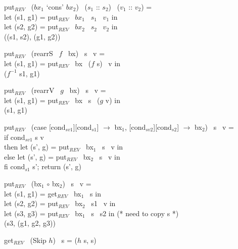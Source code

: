 \documentclass[runningheads]{llncs}
\newcommand{\revput}[3]{put$_{REV}$ \ {#1} \ {#2} \ {#3}}
\newcommand{\revget}[2]{get$_{REV}$ \ {#1} \ {#2}}
\newcommand{\product}[2]{({#1} `cons' {#2})}
\newcommand{\tuple}[2]{(#1 :: #2)}
\newcommand{\rearrS}[2]{rearrS \ #1 \ #2}
\newcommand{\rearrV}[2]{rearrV \ #1 \ #2}
\newcommand{\casebx}[6]{case [#1][#2] $\to$ #3, [#4][#5] $\to$ #6}
\begin{document}
\noindent
\revput{\product{$bx_1$}{$bx_2$}}{\tuple{$s_1$}{$s_2$}}{\tuple{$v_1$}{$v_2$}} =\\
\hspace{5mm}let (s1, g1) = \revput{$bx_1$}{$s_1$}{$v_1$} in\\
\hspace{5mm}let (s2, g2) = \revput{$bx_2$}{$s_2$}{$v_2$} in\\
\hspace{5mm}((s1, s2), (g1, g2))

\noindent
\revput{(\rearrS{$f$}{bx})}{s}{v} =\\
\hspace{5mm}let (s1, g1) = \revput{bx}{($f$ s)}{v} in\\
\hspace{5mm}($f^{-1}$ s1, g1)

\noindent
\revput{(\rearrV{$g$}{bx})}{s}{v} =\\
\hspace{5mm} let (s1, g1) = \revput{bx}{s}{($g$ v)} in\\
\hspace{5mm} (s1, g1)

\noindent
\revput{(\casebx{cond$_{sv1}$}{cond$_{s1}$}{bx$_1$}{cond$_{sv2}$}{cond$_{s2}$}{bx$_2$})}{s}{v} =\\
\hspace{5mm} if {cond$_{sv1}$ s v}\\
\hspace{5mm} then let (s', g) = \revput{bx$_1$}{s}{v} in\\
\hspace{5mm} else let (s', g) = \revput{bx$_2$}{s}{v} in\\
\hspace{5mm} fi cond$_{s1}$ s'; return (s', g)

\noindent
\revput{(bx$_1$ $\circ$ bx$_2$)}{s}{v} =\\
\hspace{5mm} let (s1, g1) = \revget{bx$_1$}{s} in\\
\hspace{5mm} let (s2, g2) = \revput{bx$_2$}{s1}{v} in\\
\hspace{5mm} let (s3, g3) = \revput{bx$_1$}{s}{s2} in (* need to copy s *)\\
\hspace{5mm} (s3, (g1, g2, g3))


\vspace{5mm}
\noindent
\revget{(Skip $h$)}{s} = {($h$ s, s)}
\end{document}
